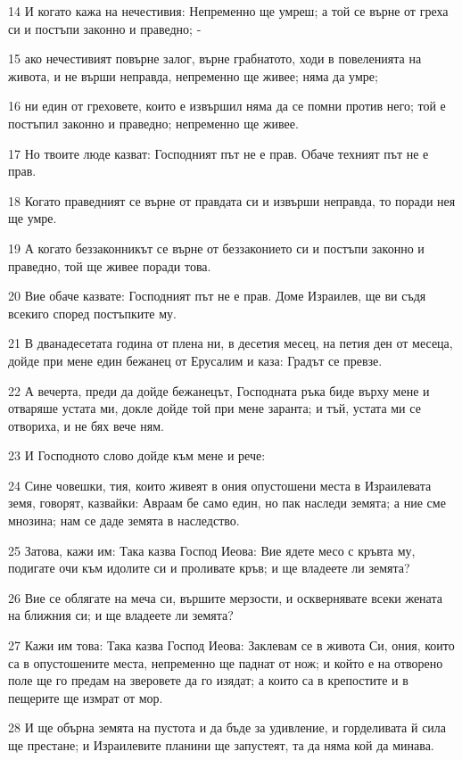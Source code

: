 \par 14 И когато кажа на нечестивия: Непременно ще умреш; а той се върне от греха си и постъпи законно и праведно; -
\par 15 ако нечестивият повърне залог, върне грабнатото, ходи в повеленията на живота, и не върши неправда, непременно ще живее; няма да умре;
\par 16 ни един от греховете, които е извършил няма да се помни против него; той е постъпил законно и праведно; непременно ще живее.
\par 17 Но твоите люде казват: Господният път не е прав. Обаче техният път не е прав.
\par 18 Когато праведният се върне от правдата си и извърши неправда, то поради нея ще умре.
\par 19 А когато беззаконникът се върне от беззаконието си и постъпи законно и праведно, той ще живее поради това.
\par 20 Вие обаче казвате: Господният път не е прав. Доме Израилев, ще ви съдя всекиго според постъпките му.
\par 21 В дванадесетата година от плена ни, в десетия месец, на петия ден от месеца, дойде при мене един бежанец от Ерусалим и каза: Градът се превзе.
\par 22 А вечерта, преди да дойде бежанецът, Господната ръка биде върху мене и отваряше устата ми, докле дойде той при мене заранта; и тъй, устата ми се отвориха, и не бях вече ням.
\par 23 И Господното слово дойде към мене и рече:
\par 24 Сине човешки, тия, които живеят в ония опустошени места в Израилевата земя, говорят, казвайки: Авраам бе само един, но пак наследи земята; а ние сме мнозина; нам се даде земята в наследство.
\par 25 Затова, кажи им: Така казва Господ Иеова: Вие ядете месо с кръвта му, подигате очи към идолите си и проливате кръв; и ще владеете ли земята?
\par 26 Вие се облягате на меча си, вършите мерзости, и осквернявате всеки жената на ближния си; и ще владеете ли земята?
\par 27 Кажи им това: Така казва Господ Иеова: Заклевам се в живота Си, ония, които са в опустошените места, непременно ще паднат от нож; и който е на отворено поле ще го предам на зверовете да го изядат; а които са в крепостите и в пещерите ще измрат от мор.
\par 28 И ще обърна земята на пустота и да бъде за удивление, и горделивата й сила ще престане; и Израилевите планини ще запустеят, та да няма кой да минава.

